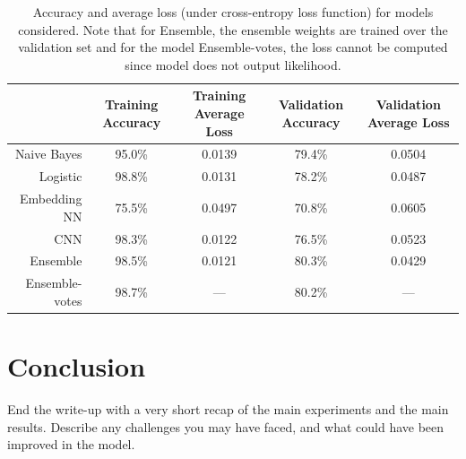 \documentclass[11pt]{article}
\begin{document}
\begin{landscape}
  \begin{table}[t]
\centering
\begin{tabular}{rcccc}
\toprule
{} & Training Accuracy &  Training Average Loss & Validation Accuracy &  Validation Average Loss \\
\midrule
Naive Bayes    &             95.0\% &                 0.0139 &               79.4\% &                   0.0504 \\
Logistic       &             98.8\% &                 0.0131 &               78.2\% &                   0.0487 \\
Embedding NN   &             75.5\% &                 0.0497 &               70.8\% &                   0.0605 \\
CNN            &             98.3\% &                 0.0122 &               76.5\% &                   0.0523 \\
Ensemble       &             98.5\% &                 0.0121 &               80.3\% &                   0.0429 \\
Ensemble-votes &             98.7\% &                    --- &               80.2\% &                      --- \\
\bottomrule
\end{tabular}
\caption{\label{tab:results} Accuracy and average loss (under cross-entropy loss
function) for models considered. Note that for Ensemble, the ensemble weights
are
trained over the validation set and for the model Ensemble-votes, the loss
cannot be computed since model does not output likelihood.}
\end{table}


\end{landscape}



\section{Conclusion}

End the write-up with a very short recap of the main experiments and the main
results. Describe any challenges you may have faced, and what could have been
improved in the model.



\end{document}
